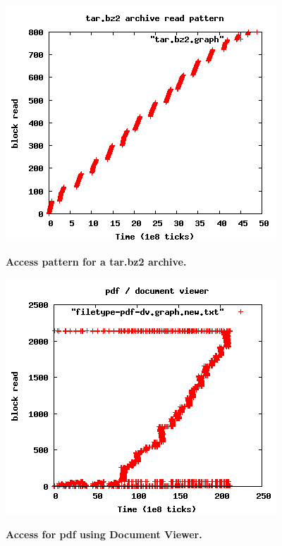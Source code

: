 \documentclass[twocolumn,10pt]{article}
\begin{document}
\begin{figure}[t!!]
\centering \resizebox{!}{2.8in}
{\includegraphics{filetype-bz2-graph.png}}
\caption{\small \bf Access pattern for a tar.bz2 archive.}
\label{fig:filetype-bz2-graph}
\end{figure}

\begin{figure}[t!!]
\centering \resizebox{!}{2.8in}
{\includegraphics{filetype-pdf-dv-graph.png}}
\caption{\small \bf Access for pdf using Document Viewer.}
\label{fig:filetype-pdf-dv-graph}
\end{figure}
\end{document}
